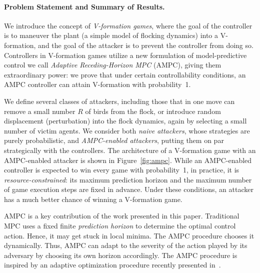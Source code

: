 \paragraph{Problem Statement and Summary of Results.}  We introduce the concept of \emph{V-formation games}, where the goal of the controller is to maneuver the plant (a simple model of flocking dynamics) into a V-formation, and the goal of the attacker is to prevent the controller from doing so.
Controllers in V-formation games utilize a new formulation of model-predictive control we call \emph{Adaptive Receding-Horizon MPC} (AMPC), giving them extraordinary power: we prove that under certain controllability conditions, an AMPC controller can attain V-formation with probability~1.

We define several classes of attackers, including those that in one move can remove a small number $R$ of birds from the flock, or introduce random displacement (perturbation) into the flock dynamics, again by selecting a small number of victim agents.  We consider both \emph{naive attackers}, whose strategies are purely probabilistic, and \emph{AMPC-enabled attackers}, putting them on par strategically with the controllers.  The architecture of a V-formation game with an AMPC-enabled attacker is shown in Figure~\ref{fig:ampc}.
While an AMPC-enabled controller is expected to win every game with probability~1, in practice, it is \emph{resource-constrained}: its maximum prediction horizon and the maximum number of game execution steps are fixed in advance.  Under these conditions, an attacker has a much better chance of winning a V-formation game.

AMPC is a key contribution of the work presented in this paper.  Traditional MPC uses a fixed finite \emph{prediction horizon} to determine the optimal control action.  Hence, it may get stuck in local minima. The AMPC procedure chooses it dynamically.  Thus, AMPC can adapt to the severity of the action played by its adversary by choosing its own horizon accordingly. The AMPC procedure is inspired by an adaptive optimization procedure recently presented in~\cite{lukina2016arxiv}.

